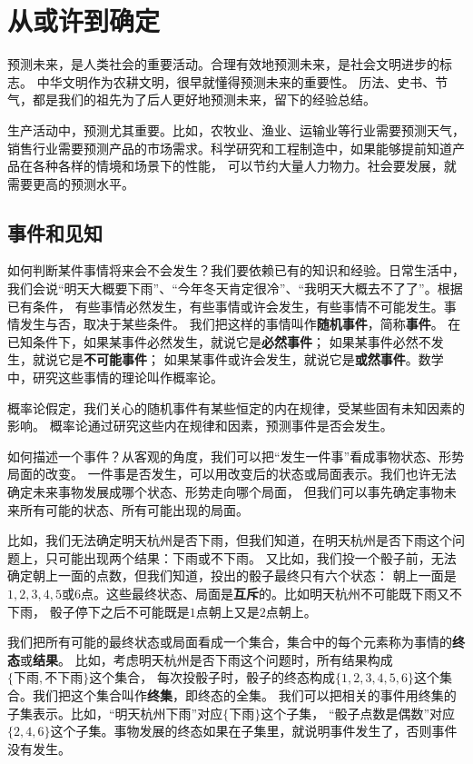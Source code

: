 \documentclass[12pt,UTF8,fontset=none]{ctexbook}
\begin{document}
\chapter{从或许到确定}
预测未来，是人类社会的重要活动。合理有效地预测未来，是社会文明进步的标志。
中华文明作为农耕文明，很早就懂得预测未来的重要性。
历法、史书、节气，都是我们的祖先为了后人更好地预测未来，留下的经验总结。

生产活动中，预测尤其重要。比如，农牧业、渔业、运输业等行业需要预测天气，
销售行业需要预测产品的市场需求。科学研究和工程制造中，如果能够提前知道产品在各种各样的情境和场景下的性能，
可以节约大量人力物力。社会要发展，就需要更高的预测水平。

\section{事件和见知}

如何判断某件事情将来会不会发生？我们要依赖已有的知识和经验。日常生活中，
我们会说“明天大概要下雨”、“今年冬天肯定很冷”、“我明天大概去不了了”。根据已有条件，
有些事情必然发生，有些事情或许会发生，有些事情不可能发生。事情发生与否，取决于某些条件。
我们把这样的事情叫作\textbf{随机事件}，简称\textbf{事件}。
在已知条件下，如果某事件必然发生，就说它是\textbf{必然事件}；
如果某事件必然不发生，就说它是\textbf{不可能事件}；
如果某事件或许会发生，就说它是\textbf{或然事件}。数学中，研究这些事情的理论叫作概率论。

概率论假定，我们关心的随机事件有某些恒定的内在规律，受某些固有未知因素的影响。
概率论通过研究这些内在规律和因素，预测事件是否会发生。

如何描述一个事件？从客观的角度，我们可以把“发生一件事”看成事物状态、形势局面的改变。
一件事是否发生，可以用改变后的状态或局面表示。我们也许无法确定未来事物发展成哪个状态、形势走向哪个局面，
但我们可以事先确定事物未来所有可能的状态、所有可能出现的局面。

比如，我们无法确定明天杭州是否下雨，但我们知道，在明天杭州是否下雨这个问题上，只可能出现两个结果：下雨或不下雨。
又比如，我们投一个骰子前，无法确定朝上一面的点数，但我们知道，投出的骰子最终只有六个状态：
朝上一面是$1,2,3,4,5$或$6$点。这些最终状态、局面是\textbf{互斥}的。比如明天杭州不可能既下雨又不下雨，
骰子停下之后不可能既是$1$点朝上又是$2$点朝上。

我们把所有可能的最终状态或局面看成一个集合，集合中的每个元素称为事情的\textbf{终态}或\textbf{结果}。
比如，考虑明天杭州是否下雨这个问题时，所有结果构成$\{\mbox{下雨}, \mbox{不下雨}\}$这个集合，
每次投骰子时，骰子的终态构成$\{1,2,3,4,5,6\}$这个集合。我们把这个集合叫作\textbf{终集}，即终态的全集。
我们可以把相关的事件用终集的子集表示。比如，“明天杭州下雨”对应$\{\mbox{下雨}\}$这个子集，
“骰子点数是偶数”对应$\{2,4,6\}$这个子集。事物发展的终态如果在子集里，就说明事件发生了，否则事件没有发生。
\end{document}
